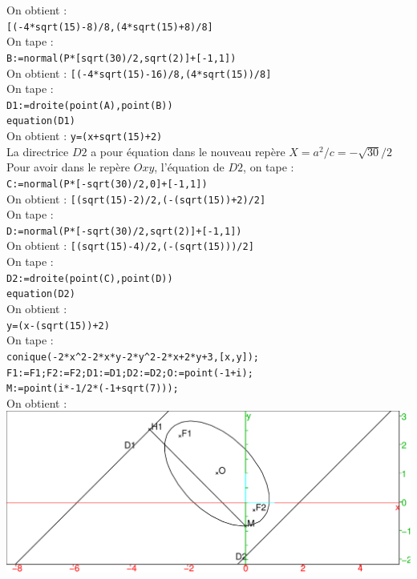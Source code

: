 \documentclass[a4paper,11pt]{book}
\begin{document}
On obtient :\\
{\tt [(-4*sqrt(15)-8)/8,(4*sqrt(15)+8)/8] }\\
On tape :\\
{\tt B:=normal(P*[sqrt(30)/2,sqrt(2)]+[-1,1])}\\
On obtient :
{\tt [(-4*sqrt(15)-16)/8,(4*sqrt(15))/8]}\\
On tape :\\
{\tt D1:=droite(point(A),point(B))}\\
{\tt equation(D1)}\\
On obtient :
{\tt y=(x+sqrt(15)+2)}\\
La directrice $D2$ a pour \'equation dans le nouveau rep\`ere
$X=a^2/c=-\sqrt{30}/2$\\
Pour avoir dans le rep\`ere $Oxy$, l'\'equation de $D2$, on tape :\\
{\tt C:=normal(P*[-sqrt(30)/2,0]+[-1,1])}\\
On obtient :
{\tt [(sqrt(15)-2)/2,(-(sqrt(15))+2)/2]}\\
On tape :\\
{\tt D:=normal(P*[-sqrt(30)/2,sqrt(2)]+[-1,1])}\\
On obtient :
{\tt [(sqrt(15)-4)/2,(-(sqrt(15)))/2]}\\
On tape :\\
{\tt D2:=droite(point(C),point(D))}\\
{\tt equation(D2)}\\
On obtient :\\
{\tt y=(x-(sqrt(15))+2)}\\
On tape :\\
{\tt conique(-2*x\verb|^|2-2*x*y-2*y\verb|^|2-2*x+2*y+3,[x,y]);\\
F1:=F1;F2:=F2;D1:=D1;D2:=D2;O:=point(-1+i);\\
M:=point(i*-1/2*(-1+sqrt(7)));}\\
On obtient :\\
\includegraphics[width=\textwidth]{ellipsef}\\
\end{document}
